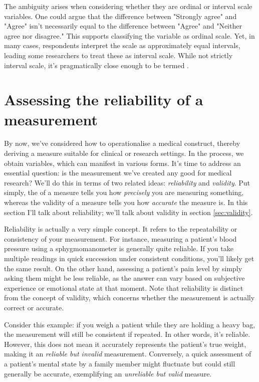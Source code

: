The ambiguity arises when considering whether they are ordinal or interval scale variables. One could argue that the difference between "Strongly agree" and "Agree" isn't necessarily equal to the difference between "Agree" and "Neither agree nor disagree." This supports classifying the variable as ordinal scale. Yet, in many cases, respondents interpret the scale as approximately equal intervals, leading some researchers to treat these as interval scale. While not strictly interval scale, it's pragmatically close enough to be termed .


\section{Assessing the reliability of a measurement~\label{sec:reliability}}

By now, we've considered how to operationalise a medical construct, thereby deriving a measure suitable for clinical or research settings. In the process, we obtain variables, which can manifest in various forms. It's time to address an essential question: is the measurement we've created any good for medical research? We'll do this in terms of two related ideas: {\it reliability} and {\it validity}. Put simply, the  of a measure tells you how {\it precisely} you are measuring something, whereas the validity of a measure tells you how {\it accurate} the measure is. In this section I'll talk about reliability; we'll talk about validity in section \ref{sec:validity}. 

Reliability is actually a very simple concept. It refers to the repeatability or consistency of your measurement. For instance, measuring a patient's blood pressure using a sphygmomanometer is generally quite reliable. If you take multiple readings in quick succession under consistent conditions, you'll likely get the same result. On the other hand, assessing a patient's pain level by simply asking them might be less reliable, as the answer can vary based on subjective experience or emotional state at that moment. Note that reliability is distinct from the concept of validity, which concerns whether the measurement is actually correct or accurate.

Consider this example: if you weigh a patient while they are holding a heavy bag, the measurement will still be consistent if repeated. In other words, it's reliable. However, this does not mean it accurately represents the patient's true weight, making it an {\it reliable but invalid} measurement. Conversely, a quick assessment of a patient's mental state by a family member might fluctuate but could still generally be accurate, exemplifying an {\it unreliable but valid} measure.

